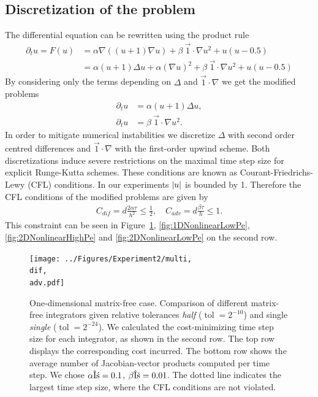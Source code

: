 \documentclass{scrartcl}
\begin{document}
\subsection{Discretization of the problem}
	The differential equation can be rewritten using the product rule
	\begin{align*}
		\partial_{t}u = F(u) 
			&= \alpha\nabla((u+1)\nabla u) 
				+ \beta\ \vec{1}\!\cdot\!\nabla u^2
				+ u(u-0.5) \\
			&= \alpha(u+1)\Delta u + \alpha(\nabla u)^2 
				+ \beta\ \vec{1}\!\cdot\!\nabla u^2 + u(u-0.5) 				
	\end{align*}
	By considering only the terms depending on $\Delta $ and $\vec{1}\!\cdot\!\nabla $ we get the modified problems
	\begin{align*}
		\partial_{t}u &= \alpha(u+1)\Delta u,
		 \\
		\partial_{t}u &= \beta~\vec{1}\!\cdot\!\nabla u^2 .
	\end{align*}
	In order to mitigate numerical instabilities we discretize $\Delta$ with second order centred differences and $\vec{1}\!\cdot\!\nabla$ with the first-order upwind scheme. Both discretizations induce severe restrictions on the maximal time step size for explicit Runge-Kutta schemes. These conditions are known as Courant-Friedrichs-Lewy (CFL) conditions. In our experiments $\lvert u\rvert$ is bounded by 1. Therefore the CFL conditions of the modified problems are given by
	\begin{align} \label{eq:CFL}
		C_{dif} = d\frac{2\alpha\tau}{h^2} \le \frac{1}{2}, \quad C_{adv} = d\frac{\beta\tau}{h} \le 1.
	\end{align}
	This constraint can be seen in Figure~\ref{fig:1DNonlinearHighPe}, \ref{fig:1DNonlinearLowPe}, \ref{fig:2DNonlinearHighPe} and \ref{fig:2DNonlinearLowPe} on the second row. 
	
	\begin{figure}[t]
		\newcommand{\dif}{\detokenize{α}=0.1}
		\newcommand{\adv}{\detokenize{β}=0.01}
		\centering
		\texttt{[image: ../Figures/Experiment2/multi, \\dif, \\adv.pdf]}
		\caption{One-dimensional matrix-free case. Comparison of different matrix-free integrators given relative tolerances \textit{half} ($\operatorname{tol} = 2^{-10}$) and single \textit{single} ($\operatorname{tol} = 2^{-24}$). We calculated the cost-minimizing time step size for each integrator, as shown in the second row. The top row displays the corresponding cost incurred. The bottom row shows the average number of Jacobian-vector products computed per time step. We chose $\alpha\dif$, $\beta\adv$. The dotted line indicates the largest time step size, where the CFL conditions are not violated.}
		\label{fig:1DNonlinearHighPe}
	\end{figure}
\end{document}
